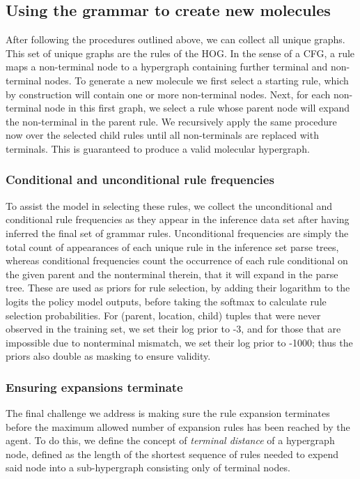 \documentclass{article}
\begin{document}
\subsection{Using the grammar to create new molecules}\label{sec:grammar_usage}
After following the procedures outlined above, we can collect all unique graphs. This set of unique graphs are the rules of the HOG. In the sense of a CFG, a rule maps a non-terminal node to a hypergraph containing further terminal and non-terminal nodes. To generate a new molecule we first select a starting rule, which by construction will contain one or more non-terminal nodes. Next, for each non-terminal node in this first graph, we select a rule whose parent node will expand the non-terminal in the parent rule. We recursively apply the same procedure now over the selected child rules until all non-terminals are replaced with terminals. This is guaranteed to produce a valid molecular hypergraph.

\subsubsection{Conditional and unconditional rule frequencies}\label{sec:freq}
To assist the model in selecting these rules, we collect the unconditional and conditional rule frequencies as they appear in the inference data set after having inferred the final set of grammar rules. Unconditional frequencies are simply the total count of appearances of each unique rule in the inference set parse trees, whereas conditional frequencies count the occurrence of each rule conditional on the given parent and the nonterminal therein, that it will expand in the parse tree. These are used as priors for rule selection, by adding their logarithm to the logits the policy model outputs, before taking the softmax to calculate rule selection probabilities.
For (parent, location, child) tuples that were never observed in the training set, we set their log prior to -3, and for those that are impossible due to nonterminal mismatch, we set their log prior to -1000; thus the priors also double as masking to ensure validity.

\subsubsection{Ensuring expansions terminate}\label{sec:termination}
The final challenge we address is making sure the rule expansion terminates before the maximum allowed number of expansion rules has been reached by the agent. To do this, we define the concept of \emph{terminal distance} of a hypergraph node, defined as the length of the shortest sequence of rules needed to expend said node into a sub-hypergraph consisting only of terminal nodes. 
\end{document}

